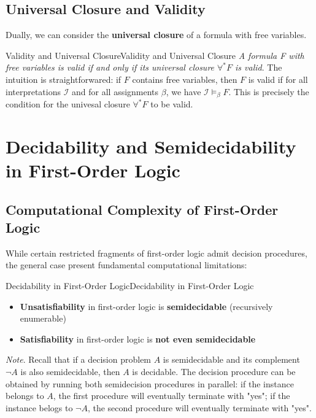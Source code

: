 \documentclass[a4paper]{article}
\theoremstyle{definition}
\begin{document}
\subsection{Universal Closure and Validity}
Dually, we can consider the \textbf{universal closure} of a formula with free variables.
\begin{theorem}{Validity and Universal Closure}{Validity and Universal Closure}
\textit{A formula F with free variables is valid if and only if its universal closure \( \forall^* F \) is valid}.
\vspace{1em}
\noindent
\newline
The intuition is straightforwared: if \( F \) contains free variables, then \( F \) is valid if for all interpretations \( \mathcal{I} \) and 
for all assignments \( \beta \), we have \( \mathcal{I} \models_{\beta} F \). This is precisely the condition for the univesal 
closure \( \forall^* F \) to be valid.
\end{theorem}
\section{Decidability and Semidecidability in First-Order Logic}
\subsection{Computational Complexity of First-Order Logic}
While certain restricted fragments of first-order logic admit decision procedures, the general case 
present fundamental computational limitations:
\begin{definition}{Decidability in First-Order Logic}{Decidability in First-Order Logic}
\begin{itemize}
	\item \textbf{Unsatisfiability} in first-order logic is \textbf{semidecidable} (recursively enumerable)
	\item \textbf{Satisfiability} in first-order logic is \textbf{not even semidecidable}
\end{itemize}
\end{definition}
\textit{Note}. Recall that if a decision problem \( A \) is semidecidable and its complement \( \lnot A \) is also 
semidecidable, then \( A \) is decidable. The decision procedure can be obtained by running both 
semidecision procedures in parallel: if the instance belongs to \( A \), the first procedure will eventually terminate with "yes";
if the instance belogs to \( \lnot A \), the second procedure will eventually terminate with "yes".
\end{document}
